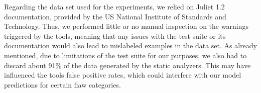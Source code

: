 Regarding the data set used for the experiments, we relied on Juliet
1.2 documentation, provided by the US National Institute of Standards and
Technology. Thus, we performed little or no manual inspection on the warnings
triggered by the tools, meaning that any issues with the test suite or its
documentation would also lead to mislabeled examples in the data set. As
already mentioned, due to
limitations of the test suite for our purposes, we also had to
discard about 91\% of the data generated by the static analyzers. This may have
influenced the tools false positive rates, which could interfere with our model
predictions for certain flaw categories.
